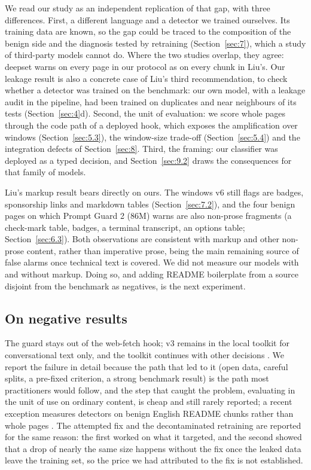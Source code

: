 \documentclass[11pt]{article}
\begin{document}
We read our study as an independent replication of that gap, with three differences. First, a different language and a detector we trained ourselves. Its training data are known, so the gap could be traced to the composition of the benign side and the diagnosis tested by retraining (Section~\ref{sec:7}), which a study of third-party models cannot do. Where the two studies overlap, they agree: deepset warns on every page in our protocol as on every chunk in Liu's. Our leakage result is also a concrete case of Liu's third recommendation, to check whether a detector was trained on the benchmark: our own model, with a leakage audit in the pipeline, had been trained on duplicates and near neighbours of its tests (Section~\ref{sec:4}d). Second, the unit of evaluation: we score whole pages through the code path of a deployed hook, which exposes the amplification over windows (Section~\ref{sec:5.3}), the window-size trade-off (Section~\ref{sec:5.4}) and the integration defects of Section~\ref{sec:8}. Third, the framing: our classifier was deployed as a typed decision, and Section~\ref{sec:9.2} draws the consequences for that family of models.

Liu's markup result bears directly on ours. The windows v6 still flags are badges, sponsorship links and markdown tables (Section~\ref{sec:7.2}), and the four benign pages on which Prompt Guard 2 (86M) warns are also non-prose fragments (a check-mark table, badges, a terminal transcript, an options table; Section~\ref{sec:6.3}). Both observations are consistent with markup and other non-prose content, rather than imperative prose, being the main remaining source of false alarms once technical text is covered. We did not measure our models with and without markup. Doing so, and adding README boilerplate from a source disjoint from the benchmark as negatives, is the next experiment.

\subsection{On negative results}\label{sec:9.4}

The guard stays out of the web-fetch hook; v3 remains in the local toolkit for conversational text only, and the toolkit continues with other decisions%
. We report the failure in detail because the path that led to it (open data, careful splits, a pre-fixed criterion, a strong benchmark result) is the path most practitioners would follow, and the step that caught the problem, evaluating in the unit of use on ordinary content, is cheap and still rarely reported; a recent exception measures detectors on benign English README chunks rather than whole pages \citep{liu2026passing}. The attempted fix and the decontaminated retraining are reported for the same reason: the first worked on what it targeted, and the second showed that a drop of nearly the same size happens without the fix once the leaked data leave the training set, so the price we had attributed to the fix is not established.
\end{document}
